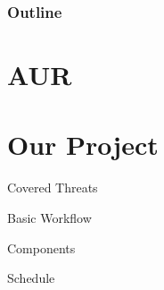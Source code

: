 \documentclass{beamer}
\title{}
\author{Lukas Krismer \& Bennett Piater}
\institute{}
\date{\today}
\begin{document}
\maketitle

\begin{frame}
	\frametitle{Outline}
	\tableofcontents
\end{frame}

\section{AUR}

\section{Our Project}

\begin{frame}{Covered Threats}
\end{frame}

\begin{frame}{Basic Workflow}
\end{frame}

\begin{frame}{Components}
\end{frame}

\begin{frame}{Schedule}
\end{frame}
\end{document}
